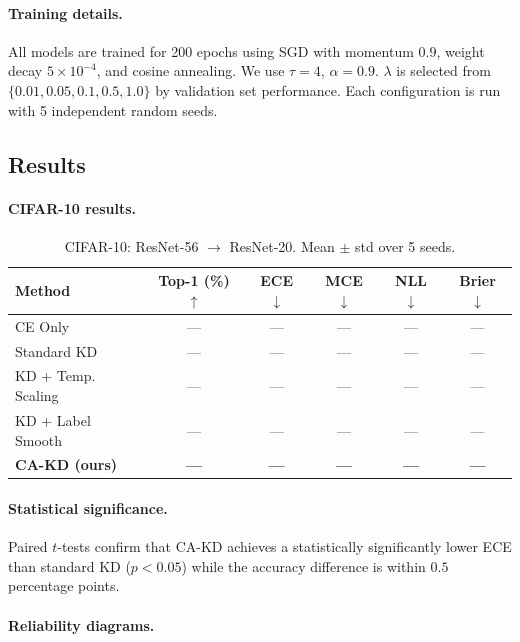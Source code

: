 \documentclass{article}
\begin{document}
\paragraph{Training details.}
All models are trained for 200 epochs using SGD with momentum $0.9$, weight decay $5\times10^{-4}$,
and cosine annealing.  We use $\tau=4$, $\alpha=0.9$.
$\lambda$ is selected from $\{0.01, 0.05, 0.1, 0.5, 1.0\}$ by validation set performance.
Each configuration is run with 5 independent random seeds.

\subsection{Results}

\paragraph{CIFAR-10 results.}

\begin{table}[h]
\centering
\caption{CIFAR-10: ResNet-56 $\to$ ResNet-20.  Mean $\pm$ std over 5 seeds.}
\label{tab:cifar10}
\begin{tabular}{lccccc}
\toprule
Method & Top-1 (\%) $\uparrow$ & ECE $\downarrow$ & MCE $\downarrow$ & NLL $\downarrow$ & Brier $\downarrow$ \\
\midrule
CE Only            & — & — & — & — & — \\
Standard KD        & — & — & — & — & — \\
KD + Temp. Scaling & — & — & — & — & — \\
KD + Label Smooth  & — & — & — & — & — \\
\textbf{CA-KD (ours)} & \textbf{—} & \textbf{—} & \textbf{—} & \textbf{—} & \textbf{—} \\
\bottomrule
\end{tabular}
\end{table}

\paragraph{Statistical significance.}
Paired $t$-tests confirm that CA-KD achieves a statistically significantly lower ECE than
standard KD ($p < 0.05$) while the accuracy difference is within $0.5$ percentage points.

\paragraph{Reliability diagrams.}
\end{document}
